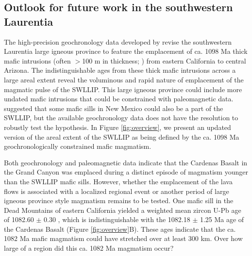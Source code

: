 \subsection*{Outlook for future work in the southwestern Laurentia}

The high-precision geochronology data developed by  revise the southwestern Laurentia large igneous province to feature the emplacement of ca. 1098 Ma thick mafic intrusions (often $>$100 m in thickness; ) from eastern California to central Arizona. The indistinguishable ages from these thick mafic intrusions across a large areal extent reveal the voluminous and rapid nature of emplacement of the magmatic pulse of the SWLLIP. This large igneous province could include more undated mafic intrusions that could be constrained with paleomagnetic data.  suggested that some mafic sills in New Mexico could also be a part of the SWLLIP, but the available geochronology data does not have the resolution to robustly test the hypothesis. In Figure \ref{fig:overview}, we present an updated version of the areal extent of the SWLLIP as being defined by the ca. 1098 Ma geochronologically constrained mafic magmatism. 

Both geochronology and paleomagnetic data indicate that the Cardenas Basalt in the Grand Canyon was emplaced during a distinct episode of magmatism younger than the SWLLIP mafic sills. However, whether the emplacement of the lava flows is associated with a localized regional event or another period of large igneous province style magmatism remains to be tested. One mafic sill in the Dead Mountains of eastern California yielded a weighted mean zircon U-Pb age of 1082.60 $\pm$ 0.30 , which is indistinguishable with the 1082.18 $\pm$ 1.25 Ma age of the Cardenas Basalt (Figure \ref{fig:overview}B). These ages indicate that the ca. 1082 Ma mafic magmatism could have stretched over at least 300 km. Over how large of a region did this ca. 1082 Ma magmatism occur?

